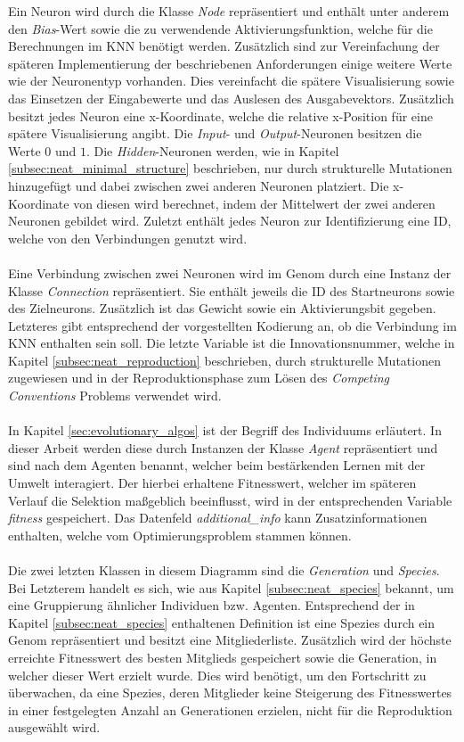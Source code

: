 Ein Neuron wird durch die Klasse \emph{Node} repräsentiert und enthält unter anderem den \emph{Bias}-Wert sowie die zu verwendende Aktivierungsfunktion, welche für die Berechnungen im \ac{KNN} benötigt werden. Zusätzlich sind zur Vereinfachung der späteren Implementierung der beschriebenen Anforderungen einige weitere Werte wie der Neuronentyp vorhanden. Dies vereinfacht die spätere Visualisierung sowie das Einsetzen der Eingabewerte und das Auslesen des Ausgabevektors. Zusätzlich besitzt jedes Neuron eine x-Koordinate, welche die relative x-Position für eine spätere Visualisierung angibt. Die \emph{Input}- und \emph{Output}-Neuronen besitzen die Werte $0$ und $1$. Die \emph{Hidden}-Neuronen werden, wie in Kapitel \ref{subsec:neat_minimal_structure} beschrieben, nur durch strukturelle Mutationen hinzugefügt und dabei zwischen zwei anderen Neuronen platziert. Die x-Koordinate von diesen wird berechnet, indem der Mittelwert der zwei anderen Neuronen gebildet wird. Zuletzt enthält jedes Neuron zur Identifizierung eine ID, welche von den Verbindungen genutzt wird.
\\\\
Eine Verbindung zwischen zwei Neuronen wird im Genom durch eine Instanz der Klasse \emph{Connection} repräsentiert. Sie enthält jeweils die ID des Startneurons sowie des Zielneurons. Zusätzlich ist das Gewicht sowie ein Aktivierungsbit gegeben. Letzteres gibt entsprechend der vorgestellten Kodierung an, ob die Verbindung im \ac{KNN} enthalten sein soll. Die letzte Variable ist die Innovationsnummer, welche in Kapitel \ref{subsec:neat_reproduction} beschrieben, durch strukturelle Mutationen zugewiesen und in der Reproduktionsphase zum Lösen des \emph{Competing Conventions} Problems verwendet wird.
\\\\
In Kapitel \ref{sec:evolutionary_algos} ist der Begriff des Individuums erläutert. In dieser Arbeit werden diese durch Instanzen der Klasse \emph{Agent} repräsentiert und sind nach dem Agenten benannt, welcher beim bestärkenden Lernen mit der Umwelt interagiert. Der hierbei erhaltene Fitnesswert, welcher im späteren Verlauf die Selektion maßgeblich beeinflusst, wird in der entsprechenden Variable \emph{fitness} gespeichert. Das Datenfeld \emph{additional\_info} kann Zusatzinformationen enthalten, welche vom Optimierungsproblem stammen können.
\\\\
Die zwei letzten Klassen in diesem Diagramm sind die \emph{Generation} und \emph{Species}. Bei Letzterem handelt es sich, wie aus Kapitel \ref{subsec:neat_species} bekannt, um eine Gruppierung ähnlicher Individuen bzw. Agenten. Entsprechend der in Kapitel \ref{subsec:neat_species} enthaltenen Definition ist eine Spezies durch ein Genom repräsentiert und besitzt eine Mitgliederliste. Zusätzlich wird der höchste erreichte Fitnesswert des besten Mitglieds gespeichert sowie die Generation, in welcher dieser Wert erzielt wurde. Dies wird benötigt, um den Fortschritt zu überwachen, da eine Spezies, deren Mitglieder keine Steigerung des Fitnesswertes in einer festgelegten Anzahl an Generationen erzielen, nicht für die Reproduktion ausgewählt wird.
